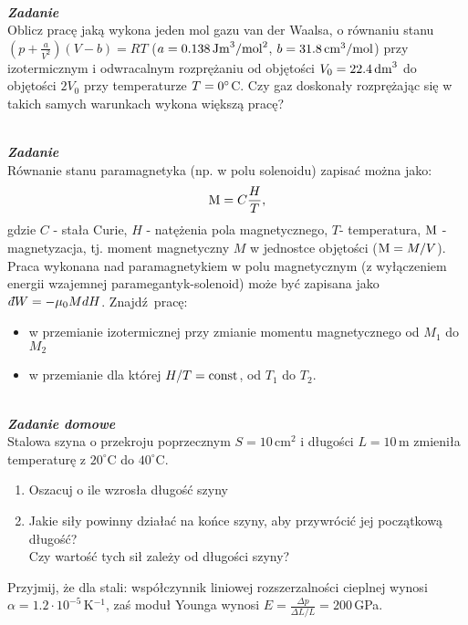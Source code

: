 \documentclass[11pt,a4paper]{article}
\newcounter{zadanie}\newcommand{\zadanie}[1][]{\addtocounter{zadanie}{1} ~\\  {\bf \emph{Zadanie \arabic{zadanie} #1 }} \\}
\newcounter{zaddom}\newcommand{\zaddom}[1][]{\addtocounter{zaddom}{1} ~\\  {\bf \emph{Zadanie domowe \arabic{zaddom} #1 }} \\}
\newcommand{\dbar}{{\mkern3mu\mathchar'26\mkern-12mu d}}
\renewcommand{\t}[1]{\textrm{#1}}
\begin{document}
\vskip 10pt

\zadanie
Oblicz pracę jaką wykona jeden mol gazu van der Waalsa, o równaniu stanu
$(p+\frac{a}{V^2})(V-b)=RT$
($a=0.138\,\rm{Jm}^3/\rm{mol}^2$, $b=31.8\,\rm{cm^3/mol}$)
przy izotermicznym i odwracalnym rozprężaniu od objętości $V_0=22.4\,\rm{dm}^3$
do objętości $2 V_0$ przy temperaturze $T=0\degree$C.
Czy gaz doskonały rozprężając się w takich samych warunkach wykona większą pracę?

\vskip 10pt

\zadanie
Równanie stanu paramagnetyka (np. w polu solenoidu) zapisać można jako:
\[  {\rm M}= C \frac{H}{T}, \]
gdzie $C$ - stała Curie, $H$ - natężenia pola magnetycznego, $T$- temperatura,
$\rm M$ - magnetyzacja, tj. moment magnetyczny $M$ w jednostce objętości (${\rm M}=M/V$).
Praca wykonana nad paramagnetykiem w polu magnetycznym
 (z wyłączeniem energii wzajemnej paramegantyk-solenoid) może być zapisana jako
 $\dbar W = -\mu_0 M dH$.
Znajdź pracę: 
\begin{itemize}
\item w przemianie izotermicznej przy zmianie momentu magnetycznego od $M_1$ do $M_2$
\item w przemianie dla której $H/T={\rm const}$, od $T_1$ do $T_2$. 
\end{itemize}


\pagebreak
\zaddom
Stalowa szyna o przekroju poprzecznym $S = 10\,$cm$^2$ i długości $L = 10\,$m zmieniła temperaturę
z $20^\circ$C do $40^\circ$C.
\begin{enumerate}
\item Oszacuj o ile wzrosła długość szyny
\item Jakie siły powinny działać na końce szyny, aby przywrócić jej początkową długość? \\
      Czy wartość tych sił zależy od długości szyny?
\end{enumerate}
Przyjmij, że dla stali: współczynnik liniowej rozszerzalności cieplnej wynosi $\alpha = 1.2\cdot 10^{-5}\,$K$^{-1}$,
zaś moduł Younga wynosi $\displaystyle E = \frac{\Delta p}{\Delta L/L} = 200\,$GPa.
\end{document}
